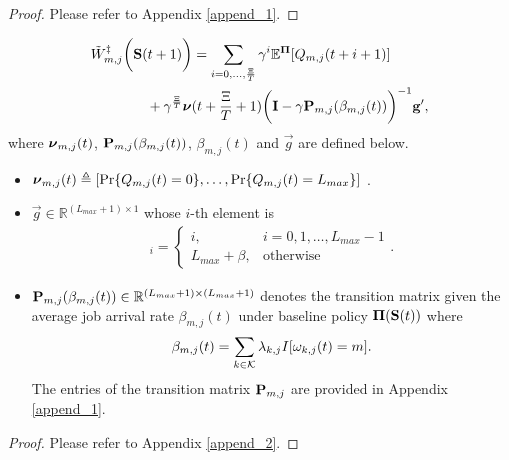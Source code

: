 \begin{proof}
    Please refer to Appendix \ref{append_1}.
\end{proof}

\begin{lemma}
    \label{lemma:w_es}
    {\small
    \begin{align}
        &\tilde{W}^{\ddagger}_{m,j}\bigg(\mathbf{S}(t+1)\bigg)
        = \sum_{i=0,\dots,\frac{\Xi}{T}} \gamma^{i} \mathbb{E}^{\boldsymbol{\Pi}}[ Q_{m,j}({t+i+1}) ]
        \nonumber\\
        &~~~~~~~~~~~~+ \gamma^{\frac{\Xi}{T}} 
        \boldsymbol{\nu}({t+\frac{\Xi}{T}+1})
        \bigg(
            \mathbf{I} - \gamma \mathbf{P}_{m,j}(\beta_{m,j}(t))
        \bigg)^{-1} \mathbf{g}',
        \label{w_es}
    \end{align}   
    }
    where $\boldsymbol{\nu}_{m,j}(t)$, $\mathbf{P}_{m,j}(\beta_{m,j}(t))$, $\beta_{m,j}(t)$ and $\vec{g}$ are defined below.
    \begin{itemize}
        \item {\small
        $\boldsymbol{\nu}_{m,j}(t) \triangleq [\Pr\{Q_{m,j}(t)=0\}, \dots, \Pr\{Q_{m,j}(t)=L_{max}\}]$
        }.

        \item $\vec{g} \in \mathbb{R}^{(L_{max}+1) \times 1}$ whose $i$-th element is
        \begin{align}
            [\vec{g}]_{i} = 
            \begin{cases}
                i, & i=0,1,\dots,L_{max}-1
                \\
                L_{max}+\beta, & \text{otherwise}
            \end{cases}.
        \end{align}

        \item $\mathbf{P}_{m,j}(\beta_{m,j}(t)) \in \mathbb{R}^{(L_{max}+1) \times (L_{max}+1)}$ denotes the transition matrix given the average job arrival rate $\beta_{m,j}(t)$ under baseline policy $\boldsymbol{\Pi}(\mathbf{S}(t))$ where
        \begin{align}
            \beta_{m,j}(t) = \sum_{k\in\mathcal{K}} \lambda_{k,j} I[\omega_{k,j}(t)=m].
        \end{align}
        The entries of the transition matrix $\mathbf{P}_{m,j}$ are provided in Appendix \ref{append_1}.
    \end{itemize}   
\end{lemma}
\begin{proof}
    Please refer to Appendix \ref{append_2}.
\end{proof}

